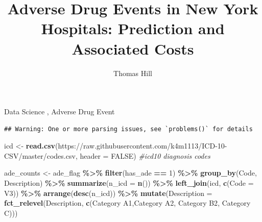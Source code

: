 \documentclass[preprint, 3p,
authoryear]{elsarticle} %
\newenvironment{Shaded}{\begin{snugshade}}{\end{snugshade}}
\newcommand{\CommentTok}[1]{\textcolor[rgb]{0.56,0.35,0.01}{\textit{#1}}}
\newcommand{\DataTypeTok}[1]{\textcolor[rgb]{0.13,0.29,0.53}{#1}}
\newcommand{\DecValTok}[1]{\textcolor[rgb]{0.00,0.00,0.81}{#1}}
\newcommand{\KeywordTok}[1]{\textcolor[rgb]{0.13,0.29,0.53}{\textbf{#1}}}
\newcommand{\NormalTok}[1]{#1}
\newcommand{\OperatorTok}[1]{\textcolor[rgb]{0.81,0.36,0.00}{\textbf{#1}}}
\newcommand{\OtherTok}[1]{\textcolor[rgb]{0.56,0.35,0.01}{#1}}
\newcommand{\StringTok}[1]{\textcolor[rgb]{0.31,0.60,0.02}{#1}}
\begin{document}
\begin{frontmatter}

  \title{Adverse Drug Events in New York Hospitals: Prediction and
Associated Costs}
    \author[CUNY School of Profesional Services]{Thomas Hill%
  }
  
  \begin{abstract}
  
  \end{abstract}
    \begin{keyword}
    Data Science \sep 
    Adverse Drug Event
  \end{keyword}
  
 \end{frontmatter}

\begin{verbatim}
## Warning: One or more parsing issues, see `problems()` for details
\end{verbatim}

\begin{Shaded}
\begin{Highlighting}[]
\NormalTok{icd \textless{}{-}}\StringTok{ }\KeywordTok{read.csv}\NormalTok{(}\StringTok{\textquotesingle{}https://raw.githubusercontent.com/k4m1113/ICD{-}10{-}CSV/master/codes.csv\textquotesingle{}}\NormalTok{, }\DataTypeTok{header =}  \OtherTok{FALSE}\NormalTok{) }\CommentTok{\#icd10 diagnosis codes}

\NormalTok{ade\_counts \textless{}{-}}\StringTok{ }\NormalTok{ade\_flag }\OperatorTok{\%\textgreater{}\%}
\StringTok{  }\KeywordTok{filter}\NormalTok{(has\_ade }\OperatorTok{==}\StringTok{ }\DecValTok{1}\NormalTok{) }\OperatorTok{\%\textgreater{}\%}
\StringTok{  }\KeywordTok{group\_by}\NormalTok{(Code, Description) }\OperatorTok{\%\textgreater{}\%}
\StringTok{  }\KeywordTok{summarize}\NormalTok{(}\DataTypeTok{n\_icd =} \KeywordTok{n}\NormalTok{()) }\OperatorTok{\%\textgreater{}\%}
\StringTok{  }\KeywordTok{left\_join}\NormalTok{(icd, }\KeywordTok{c}\NormalTok{(}\StringTok{\textquotesingle{}Code\textquotesingle{}}\NormalTok{ =}\StringTok{ \textquotesingle{}V3\textquotesingle{}}\NormalTok{)) }\OperatorTok{\%\textgreater{}\%}
\StringTok{  }\KeywordTok{arrange}\NormalTok{(}\KeywordTok{desc}\NormalTok{(n\_icd)) }\OperatorTok{\%\textgreater{}\%}
\StringTok{  }\KeywordTok{mutate}\NormalTok{(}\DataTypeTok{Description =} \KeywordTok{fct\_relevel}\NormalTok{(Description, }\KeywordTok{c}\NormalTok{(}\StringTok{\textquotesingle{}Category A1\textquotesingle{}}\NormalTok{,}\StringTok{\textquotesingle{}Category A2\textquotesingle{}}\NormalTok{, }\StringTok{\textquotesingle{}Category B2\textquotesingle{}}\NormalTok{, }\StringTok{\textquotesingle{}Category C\textquotesingle{}}\NormalTok{)))}
\end{Highlighting}
\end{Shaded}
\end{document}
